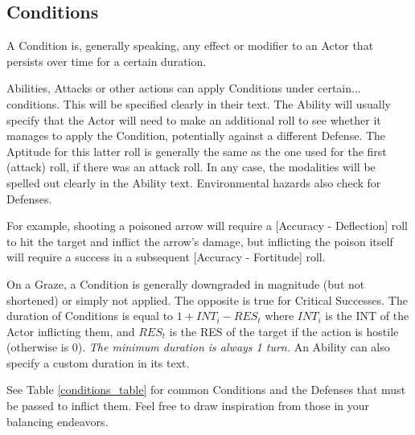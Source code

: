 \subsection{Conditions}
\label{conditions}

A Condition is, generally speaking, any effect or modifier to an Actor that persists over time for a certain duration.

Abilities, Attacks or other actions can apply Conditions under certain... conditions. This will be specified clearly in their text. The Ability will usually specify that the Actor will need to make an additional roll to see whether it manages to apply the Condition, potentially against a different Defense. The Aptitude for this latter roll is generally the same as the one used for the first (attack) roll, if there was an attack roll. In any case, the modalities will be spelled out clearly in the Ability text. Environmental hazards also check for Defenses. 

For example, shooting a poisoned arrow will require a [Accuracy - Deflection] roll to hit the target and inflict the arrow's damage, but inflicting the poison itself will require a success in a subsequent [Accuracy - Fortitude] roll.

On a Graze, a Condition is generally downgraded in magnitude (but not shortened) or simply not applied. The opposite is true for Critical Successes. The duration of Conditions is equal to $1+INT_i-RES_t$ where $INT_i$ is the INT of the Actor inflicting them, and $RES_t$ is the RES of the target if the action is hostile (otherwise is 0). \textit{The minimum duration is always 1 turn.} An Ability can also specify a custom duration in its text.

See Table \ref{conditions_table} for common Conditions and the Defenses that must be passed to inflict them. Feel free to draw inspiration from those in your balancing endeavors. 


